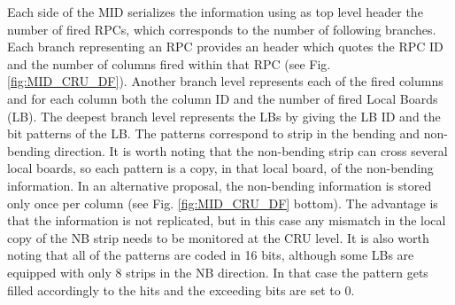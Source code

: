 Each side of the MID serializes the information using as top level header the number of fired RPCs, which corresponds to the number of following branches.
Each branch representing an RPC provides an header which quotes the RPC ID and the number of columns fired within that RPC (see Fig. \ref{fig:MID_CRU_DF}).
Another branch level represents each of the fired columns and for each column both the column ID and the number of fired Local Boards (LB).
The deepest branch level represents the LBs by giving the LB ID and the bit patterns of the LB.
The patterns correspond to strip in the bending and non-bending direction. 
It is worth noting that the non-bending strip can cross several local boards, so each pattern is a copy, in that local board, of the non-bending information.
In an alternative proposal, the non-bending information is stored only once per column (see Fig. \ref{fig:MID_CRU_DF} bottom). 
The advantage is that the information is not replicated, but in this case any mismatch in the local copy of the NB strip needs to be monitored at the CRU level.
It is also worth noting that all of the patterns are coded in 16 bits, although some LBs are equipped with only 8 strips in the NB direction.
In that case the pattern gets filled accordingly to the hits and the exceeding bits are set to 0.

